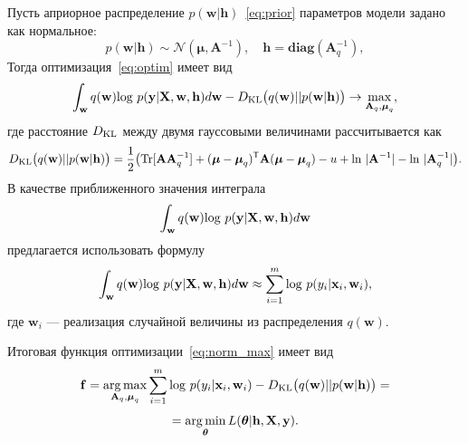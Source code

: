 Пусть априорное распределение $p(\mathbf{w}|\mathbf{h})$~\eqref{eq:prior} параметров модели задано как нормальное:
\[
	p(\mathbf{w}|\mathbf{h}) \sim \mathcal{N}(\boldsymbol{\mu}, \mathbf{A}^{-1}),\quad \mathbf{h} = \textbf{diag}(\mathbf{A}^{-1}_q),
\] 
Тогда оптимизация~\eqref{eq:optim} имеет вид
\begin{equation}
\label{eq:norm_max}
 \int_{\mathbf{w}} q(\mathbf{w})\textnormal{log}~{p(\mathbf{y}|\mathbf{X},\mathbf{w},\mathbf{h})} d \mathbf{w} - D_\textnormal{KL}\bigl(q (\mathbf{w} )|| p (\mathbf{w}|\mathbf{h})\bigr) \to \max_{\mathbf{A}_q, \boldsymbol{\mu}_q},
\end{equation}
где расстояние $D_\textnormal{KL}$ между двумя гауссовыми величинами рассчитывается как 
\[
	D_\textnormal{KL}\bigl(q (\mathbf{w}) || p (\mathbf{w}|\mathbf{h})\bigr) = \frac{1}{2} \bigl( \textnormal{Tr} [\mathbf{A}\mathbf{A}^{-1}_q] + (\boldsymbol{\mu} - \boldsymbol{\mu}_q)^\mathsf{T}\mathbf{A}(\boldsymbol{\mu} - \boldsymbol{\mu}_q) - u +\textnormal{ln}~|\mathbf{A}^{-1}| - \textnormal{ln}~|\mathbf{A}_q^{-1}| \bigr).
\]
В качестве приближенного значения интеграла $$\int_{\mathbf{w}} q(\mathbf{w})\textnormal{log}~{p(\mathbf{y}|\mathbf{X},\mathbf{w},\mathbf{h})} d \mathbf{w}$$ предлагается использовать формулу
\[
\int_{\mathbf{w}} q(\mathbf{w})\textnormal{log}~{p(\mathbf{y}|\mathbf{X},\mathbf{w},\mathbf{h})} d \mathbf{w} \approx \sum_{i=1}^m \textnormal{log}~p({y}_i|\mathbf{x}_i, \mathbf{w}_i),
\]
где $\mathbf{w}_i$  --- реализация случайной величины из распределения $q(\mathbf{w})$.

Итоговая функция оптимизации~\eqref{eq:norm_max} имеет вид
\begin{equation}
\label{eq:gaus}
	\mathbf{f} = \operatorname*{arg\,max}_{\mathbf{A}_q, \boldsymbol{\mu}_q} \sum_{i=1}^m \textnormal{log}~p({y}_i|\mathbf{x}_i, \mathbf{w}_i) - D_\textnormal{KL}\bigl(q (\mathbf{w} )|| p (\mathbf{w}|\mathbf{h})\bigr) =
\end{equation}
\[
   = \operatorname*{arg\,min}_{\boldsymbol{\theta}} L( \boldsymbol{\theta}| \mathbf{h}, \mathbf{X}, \mathbf{y}).
\]

